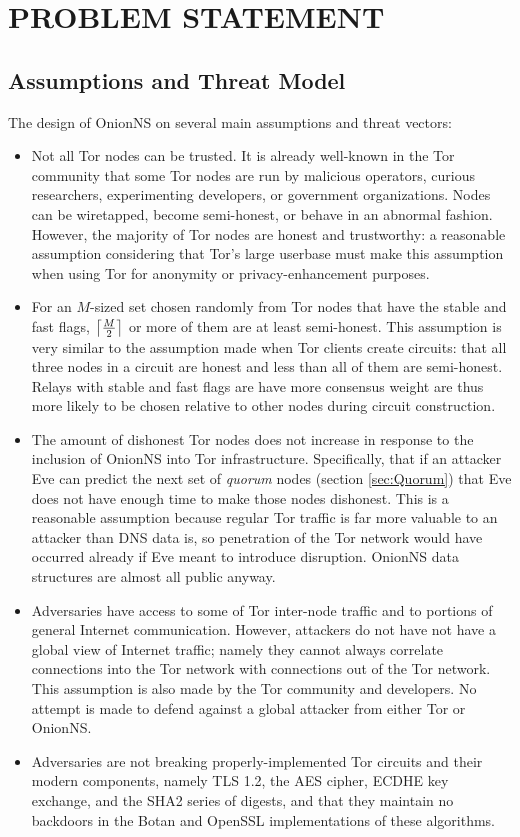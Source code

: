 
\chapter{PROBLEM STATEMENT}

\section{Assumptions and Threat Model}

The design of OnionNS on several main assumptions and threat vectors:

\begin{itemize}
  \item Not all Tor nodes can be trusted. It is already well-known in the Tor community that some Tor nodes are run by malicious operators, curious researchers, experimenting developers, or government organizations. Nodes can be wiretapped, become semi-honest, or behave in an abnormal fashion. However, the majority of Tor nodes are honest and trustworthy: a reasonable assumption considering that Tor's large userbase must make this assumption when using Tor for anonymity or privacy-enhancement purposes.
  \item For an $ M $-sized set chosen randomly from Tor nodes that have the stable and fast flags, $ \ceil[\big]{\frac{M}{2}} $ or more of them are at least semi-honest. This assumption is very similar to the assumption made when Tor clients create circuits: that all three nodes in a circuit are honest and less than all of them are semi-honest. Relays with stable and fast flags are have more consensus weight are thus more likely to be chosen relative to other nodes during circuit construction.
  \item The amount of dishonest Tor nodes does not increase in response to the inclusion of OnionNS into Tor infrastructure. Specifically, that if an attacker Eve can predict the next set of \emph{quorum} nodes (section \ref{sec:Quorum}) that Eve does not have enough time to make those nodes dishonest. This is a reasonable assumption because regular Tor traffic is far more valuable to an attacker than DNS data is, so penetration of the Tor network would have occurred already if Eve meant to introduce disruption. OnionNS data structures are almost all public anyway.
  \item Adversaries have access to some of Tor inter-node traffic and to portions of general Internet communication. However, attackers do not have not have a global view of Internet traffic; namely they cannot always correlate connections into the Tor network with connections out of the Tor network. This assumption is also made by the Tor community and developers. No attempt is made to defend against a global attacker from either Tor or OnionNS.
  \item Adversaries are not breaking properly-implemented Tor circuits and their modern components, namely TLS 1.2, the AES cipher, ECDHE key exchange, and the SHA2 series of digests, and that they maintain no backdoors in the Botan and OpenSSL implementations of these algorithms.
\end{itemize}

